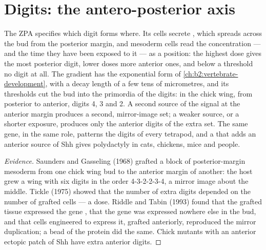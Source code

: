 \section{Digits: the antero-posterior axis}

\begin{proposition}\label{prop:b2:limb-organogenesis:zpa}
The ZPA specifies which digit forms where. Its cells secrete , which spreads across the bud from the posterior margin,
and mesoderm cells read the concentration --- and the time they have
been exposed to it --- as a position: the highest dose gives the
most posterior digit, lower doses more anterior ones, and below a
threshold no digit at all. The gradient has the exponential form of
\cref{ch:b2:vertebrate-development}, with a decay length of a few
tens of micrometres, and its thresholds cut the bud into the
primordia of the digits: in the chick wing, from posterior to
anterior, digits 4, 3 and 2. A second source of the signal at the
anterior margin produces a second, mirror-image set; a weaker
source, or a shorter exposure, produces only the anterior digits of
the extra set. The same gene, in the same role, patterns the digits
of every tetrapod, and a  that adds an anterior source of
Shh gives polydactyly in cats, chickens, mice and people.
\end{proposition}
\begin{proof}[Evidence]
Saunders and Gasseling (1968) grafted a block of posterior-margin
mesoderm from one chick wing bud to the anterior margin of another:
the host grew a wing with six digits in the order 4-3-2-2-3-4, a
mirror image about the middle. Tickle (1975) showed that the number
of extra digits depended on the number of grafted cells --- a dose.
Riddle and Tabin (1993) found that the grafted tissue expressed the
gene \emph{}, that the gene was expressed nowhere else
in the bud, and that cells engineered to express it, grafted
anteriorly, reproduced the mirror duplication; a bead of the protein
did the same. Chick mutants with an anterior ectopic patch of Shh
have extra anterior digits.
\end{proof}


